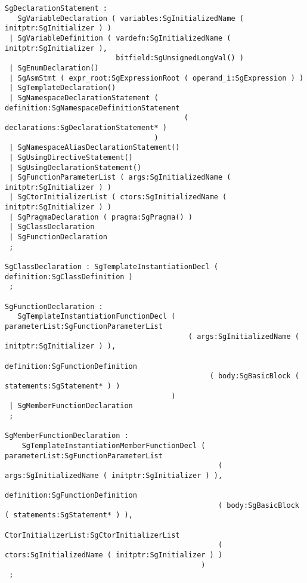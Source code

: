 \begin{verbatim}
SgDeclarationStatement : 
   SgVariableDeclaration ( variables:SgInitializedName ( initptr:SgInitializer ) )
 | SgVariableDefinition ( vardefn:SgInitializedName ( initptr:SgInitializer ), 
                          bitfield:SgUnsignedLongVal() )
 | SgEnumDeclaration()
 | SgAsmStmt ( expr_root:SgExpressionRoot ( operand_i:SgExpression ) )
 | SgTemplateDeclaration()
 | SgNamespaceDeclarationStatement ( definition:SgNamespaceDefinitionStatement 
                                          ( declarations:SgDeclarationStatement* ) 
                                   )
 | SgNamespaceAliasDeclarationStatement()
 | SgUsingDirectiveStatement()
 | SgUsingDeclarationStatement()
 | SgFunctionParameterList ( args:SgInitializedName ( initptr:SgInitializer ) )
 | SgCtorInitializerList ( ctors:SgInitializedName ( initptr:SgInitializer ) )
 | SgPragmaDeclaration ( pragma:SgPragma() )
 | SgClassDeclaration
 | SgFunctionDeclaration
 ;

SgClassDeclaration : SgTemplateInstantiationDecl ( definition:SgClassDefinition )
 ;

SgFunctionDeclaration : 
   SgTemplateInstantiationFunctionDecl ( parameterList:SgFunctionParameterList 
                                           ( args:SgInitializedName ( initptr:SgInitializer ) ), 
                                             definition:SgFunctionDefinition
                                                ( body:SgBasicBlock ( statements:SgStatement* ) )
                                       )
 | SgMemberFunctionDeclaration
 ;

SgMemberFunctionDeclaration : 
    SgTemplateInstantiationMemberFunctionDecl ( parameterList:SgFunctionParameterList 
                                                  ( args:SgInitializedName ( initptr:SgInitializer ) ), 
                                                definition:SgFunctionDefinition 
                                                  ( body:SgBasicBlock ( statements:SgStatement* ) ), 
                                                CtorInitializerList:SgCtorInitializerList 
                                                  ( ctors:SgInitializedName ( initptr:SgInitializer ) ) 
                                              )
 ;


\end{verbatim}
